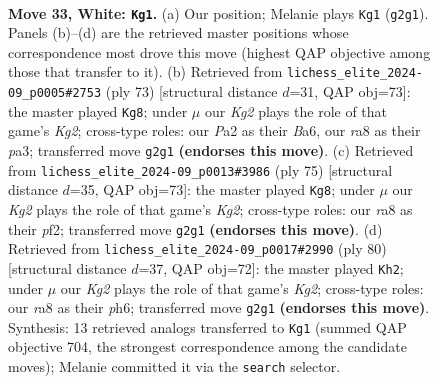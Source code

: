 \documentclass[11pt]{article}
\begin{document}
\clearpage

\begin{figure}[p]\centering
\begin{subfigure}{0.46\textwidth}\centering
\resizebox{\linewidth}{!}{%
\newchessgame
\chessboard[
  setfen={r7/2Q4p/3pkp2/8/pP2q3/6P1/P4PKP/8 w - - 1 33},
  showmover=false,
  pgfstyle=straightmove, color=movearrow, markmove={g2-g1}
]}
\caption{}
\end{subfigure}\hfill
\begin{subfigure}{0.46\textwidth}\centering
\resizebox{\linewidth}{!}{%
\newchessgame
\chessboard[
  setfen={8/5pk1/b5p1/2P1Q2p/7P/P7/3q1PPK/8 b - - 2 37},
  showmover=false,
  pgfstyle=straightmove, color=movearrow, markmove={g7-g8}
]}
\caption{}
\end{subfigure}
\\[4pt]
\begin{subfigure}{0.46\textwidth}\centering
\resizebox{\linewidth}{!}{%
\newchessgame
\chessboard[
  setfen={8/5pk1/6pp/4Q3/p7/P2qP2P/5PP1/6K1 b - - 2 38},
  showmover=false,
  pgfstyle=straightmove, color=movearrow, markmove={g7-g8}
]}
\caption{}
\end{subfigure}\hfill
\begin{subfigure}{0.46\textwidth}\centering
\resizebox{\linewidth}{!}{%
\newchessgame
\chessboard[
  setfen={7k/1p3Qp1/1Pp4p/8/p3q2P/P5P1/5PK1/8 w - - 0 41},
  showmover=false,
  pgfstyle=straightmove, color=movearrow, markmove={g2-h2}
]}
\caption{}
\end{subfigure}
\caption{\textbf{Move 33, White: \texttt{Kg1}.} (a) Our position; Melanie plays \texttt{Kg1} (\texttt{g2g1}). Panels (b)--(d) are the retrieved master positions whose correspondence most drove this move (highest QAP objective among those that transfer to it). (b) Retrieved from \texttt{lichess\_elite\_2024-09\_p0005\#2753} (ply 73) [structural distance $d$=31, QAP obj=73]: the master played \texttt{Kg8}; under $\mu$ our \emph{Kg2} plays the role of that game's \emph{Kg2}; cross-type roles: our \emph{P}a2 as their \emph{B}a6, our \emph{r}a8 as their \emph{p}a3; transferred move \texttt{g2g1} \textbf{(endorses this move)}. (c) Retrieved from \texttt{lichess\_elite\_2024-09\_p0013\#3986} (ply 75) [structural distance $d$=35, QAP obj=73]: the master played \texttt{Kg8}; under $\mu$ our \emph{Kg2} plays the role of that game's \emph{Kg2}; cross-type roles: our \emph{r}a8 as their \emph{p}f2; transferred move \texttt{g2g1} \textbf{(endorses this move)}. (d) Retrieved from \texttt{lichess\_elite\_2024-09\_p0017\#2990} (ply 80) [structural distance $d$=37, QAP obj=72]: the master played \texttt{Kh2}; under $\mu$ our \emph{Kg2} plays the role of that game's \emph{Kg2}; cross-type roles: our \emph{r}a8 as their \emph{p}h6; transferred move \texttt{g2g1} \textbf{(endorses this move)}. Synthesis: 13 retrieved analogs transferred to \texttt{Kg1} (summed QAP objective 704, the strongest correspondence among the candidate moves); Melanie committed it via the \texttt{search} selector.}
\label{fig:thought-m64}
\end{figure}
\end{document}
